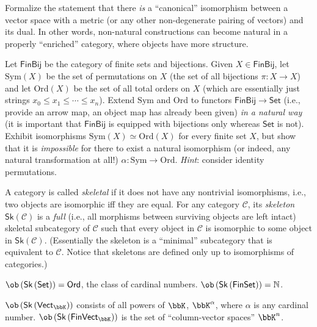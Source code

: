 %
\begin{xca}
    Formalize the statement that there \emph{is} a ``canonical'' isomorphism between a vector space with a metric (or any other non-degenerate pairing of vectors) and its dual. In other words, non-natural constructions can become natural in a properly ``enriched'' category, where objects have more structure.
\end{xca}
%
\begin{xca}
    Let $\mathsf{FinBij}$ be the category of finite sets and bijections. Given $X\in\mathsf{FinBij}$, let $\mathrm{Sym}(X)$ be the set of permutations on $X$ (the set of all bijections $\pi:X\to X$) and let $\mathrm{Ord}(X)$ be the set of all total orders on $X$ (which are essentially just strings $x_0\le x_1\le\cdots\le x_n$). Extend $\mathrm{Sym}$ and $\mathrm{Ord}$ to functors $\mathsf{FinBij}\to\mathsf{Set}$ (i.e., provide an arrow map, an object map has already been given) \emph{in a natural way} (it is important that $\mathsf{FinBij}$ is equipped with bijections only whereas $\mathsf{Set}$ is not). Exhibit isomorphisms $\mathrm{Sym}(X)\simeq\mathrm{Ord}(X)$ for every finite set $X$, but show that it is \emph{impossible} for there to exist a natural isomorphism (or indeed, any natural transformation at all!) $\alpha:\mathrm{Sym}\to\mathrm{Ord}$. \emph{Hint}: consider identity permutations.
\end{xca}
%
\begin{defn}[Skeleton]
    A category is called \emph{skeletal} if it does not have any nontrivial
    isomorphisms, i.e., two objects are isomorphic iff they are equal.
    For any category $\mathcal{C}$, its \emph{skeleton} $\mathsf{Sk}\left(\mathcal{C}\right)$
    is a \emph{full} (i.e., all morphisms between surviving objects are left intact) skeletal subcategory
    of $\mathcal{C}$ such that every object in $\mathcal{C}$ is isomorphic
    to some object in $\mathsf{Sk}\left(\mathcal{C}\right)$. (Essentially
    the skeleton is a ``minimal'' subcategory that is equivalent to
    $\mathcal{C}$. Notice that skeletons are defined only up to isomorphisms
    of categories.)
\end{defn}
\begin{example}
    $\ob\left(\mathsf{Sk}\left(\mathsf{Set}\right)\right)=\mathsf{Ord}$,
    the class of cardinal numbers. $\ob\left(\mathsf{Sk}\left(\mathsf{FinSet}\right)\right)=\mathbb{N}$. 
\end{example}
%
\begin{example}
    $\ob\left(\mathsf{Sk}\left(\mathsf{Vect}_{\bbK}\right)\right)$ consists
    of all powers of $\bbK$, $\bbK^{\alpha}$, where $\alpha$ is any cardinal
    number. $\ob\left(\mathsf{Sk}\left(\mathsf{FinVect}_{\bbK}\right)\right)$
    is the set of ``column-vector spaces'' $\bbK^{n}$.
    \end{example}
